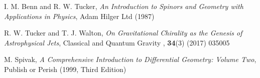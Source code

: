 \documentclass[sections]{tjwNOTES}
\begin{document}
\newpage
\renewcommand{\refname}{References}
\begin{thebibliography}{0}
	 	I. M. Benn and R. W. Tucker, {\it An Introduction to Spinors and Geometry with Applications in Physics}, Adam Hilger Ltd (1987)
	
		R. W. Tucker and T. J. Walton, {\it On Gravitational Chirality as the Genesis of Astrophysical Jets}, Classical and Quantum Gravity	, {\bf 34}(3) (2017) 035005
	
			M. Spivak, {\it A Comprehensive Introduction to Differential Geometry: Volume Two}, Publish or Perish (1999, Third Edition)	
\end{thebibliography}










\end{document}
